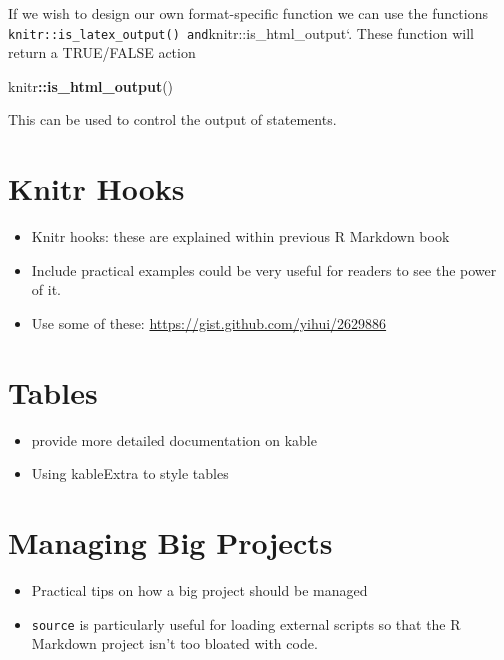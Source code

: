 \documentclass[]{book}
\newenvironment{Shaded}{\begin{snugshade}}{\end{snugshade}}
\newcommand{\KeywordTok}[1]{\textcolor[rgb]{0.13,0.29,0.53}{\textbf{#1}}}
\newcommand{\OperatorTok}[1]{\textcolor[rgb]{0.81,0.36,0.00}{\textbf{#1}}}
\newcommand{\NormalTok}[1]{#1}
\providecommand{\tightlist}{%
  \setlength{\itemsep}{0pt}\setlength{\parskip}{0pt}}
\begin{document}
If we wish to design our own format-specific function we can use the
functions
\texttt{knitr::is\_latex\_output()\ and}knitr::is\_html\_output`. These
function will return a TRUE/FALSE action

\begin{Shaded}
\begin{Highlighting}[]
\NormalTok{knitr}\OperatorTok{::}\KeywordTok{is_html_output}\NormalTok{()}
\end{Highlighting}
\end{Shaded}

This can be used to control the output of statements.

\chapter{Knitr Hooks}\label{knitr-hooks}

\begin{itemize}
\tightlist
\item
  Knitr hooks: these are explained within previous R Markdown book
\item
  Include practical examples could be very useful for readers to see the
  power of it.
\item
  Use some of these: \url{https://gist.github.com/yihui/2629886}
\end{itemize}

\chapter{Tables}\label{tables}

\begin{itemize}
\tightlist
\item
  provide more detailed documentation on kable
\item
  Using kableExtra to style tables
\end{itemize}

\chapter{Managing Big Projects}\label{managing-big-projects}

\begin{itemize}
\tightlist
\item
  Practical tips on how a big project should be managed
\item
  \texttt{source} is particularly useful for loading external scripts so
  that the R Markdown project isn't too bloated with code.
\end{itemize}
\end{document}
